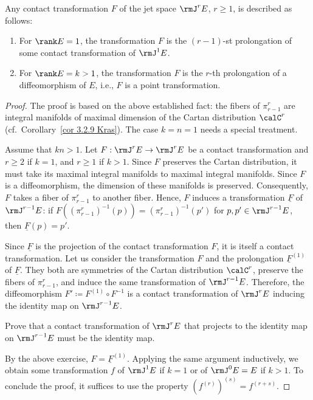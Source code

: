 \begin{thm}\label{thm 3.3.1 Kras}
    Any contact transformation $F$ of the jet space $\rmJ^rE$, $r\geq 1$, is described as follows:
    \begin{enumerate}
        \item For $\rank E=1$, the transformation $F$ is the $(r-1)$-st prolongation of some contact transformation of $\rmJ^1E$.
        \item For $\rank E=k>1$, the transformation $F$ is the $r$-th prolongation of a diffeomorphism of $E$, i.e., $F$ is a point transformation.
    \end{enumerate}
\end{thm}
\begin{proof}
    The proof is based on the above established fact: the fibers of $\pi^r_{r-1}$ are integral manifolds of maximal dimension of the Cartan distribution $\calC^r$ (cf.\ Corollary~\ref{cor 3.2.9 Kras}). The case $k=n=1$ needs a special treatment.

    Assume that $kn>1$. Let $F:\rmJ^rE\to \rmJ^rE$ be a contact transformation and $r\geq 2$ if $k=1$, and $r\geq 1$ if $k>1$. Since $F$ preserves the Cartan distribution, it must take its maximal integral manifolds to maximal integral manifolds. Since $F$ is a diffeomorphism, the dimension of these manifolds is preserved. Consequently, $F$ takes a fiber of $\pi^r_{r-1}$ to another fiber. Hence, $F$ induces a transformation $\underline{F}$ of $\rmJ^{r-1}E$: if $F\left((\pi^r_{r-1})^{-1}(p)\right)=(\pi^r_{r-1})^{-1}(p')$ for $p,p'\in\rmJ^{r-1}E$, then $\underline{F}(p)=p'$.

    Since $\underline{F}$ is the projection of the contact transformation $F$, it is itself a contact transformation. Let us consider the transformation $F$ and the prolongation $\underline{F}^{(1)}$ of $\underline{F}$. They both are symmetries of the Cartan distribution $\calC^r$, preserve the fibers of $\pi^r_{r-1}$, and induce the same transformation of $\rmJ^{r-1}E$. Therefore, the diffeomorphism $F'\coloneqq F^{(1)}\circ F^{-1}$ is a contact transformation of $\rmJ^rE$ inducing the identity map on $\rmJ^{r-1}E$.

    \begin{xca}
        Prove that a contact transformation of $\rmJ^rE$ that projects to the identity map on $\rmJ^{r-1}E$ must be the identity map.
    \end{xca}

    By the above exercise, $F=\underline{F}^{(1)}$. Applying the same argument inductively, we obtain some transformation $f$ of $\rmJ^1E$ if $k=1$ or of $\rmJ^0E=E$ if $k>1$. To conclude the proof, it suffices to use the property $(f^{(r)})^{(s)}=f^{(r+s)}$.


\end{proof}
